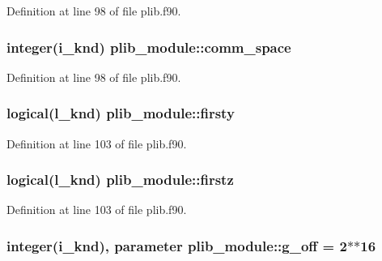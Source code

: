 Definition at line 98 of file plib.\-f90.

\hypertarget{classplib__module_aa5bc6028743a524c4466548e276cb839}{
\subsubsection[{comm\-\_\-space}]{\setlength{\rightskip}{0pt plus 5cm}integer(i\-\_\-knd) plib\-\_\-module\-::comm\-\_\-space}}\label{classplib__module_aa5bc6028743a524c4466548e276cb839}


Definition at line 98 of file plib.\-f90.

\hypertarget{classplib__module_acacb5f9f63dcc742ef176b99534fe626}{
\subsubsection[{firsty}]{\setlength{\rightskip}{0pt plus 5cm}logical(l\-\_\-knd) plib\-\_\-module\-::firsty}}\label{classplib__module_acacb5f9f63dcc742ef176b99534fe626}


Definition at line 103 of file plib.\-f90.

\hypertarget{classplib__module_a2d791ed6cdd38a29604dcb99a7a556fe}{
\subsubsection[{firstz}]{\setlength{\rightskip}{0pt plus 5cm}logical(l\-\_\-knd) plib\-\_\-module\-::firstz}}\label{classplib__module_a2d791ed6cdd38a29604dcb99a7a556fe}


Definition at line 103 of file plib.\-f90.

\hypertarget{classplib__module_aa3f6bda8ab61c2acbdaf18afe105dbae}{
\subsubsection[{g\-\_\-off}]{\setlength{\rightskip}{0pt plus 5cm}integer(i\-\_\-knd), parameter plib\-\_\-module\-::g\-\_\-off = 2$\ast$$\ast$16}}\label{classplib__module_aa3f6bda8ab61c2acbdaf18afe105dbae}


